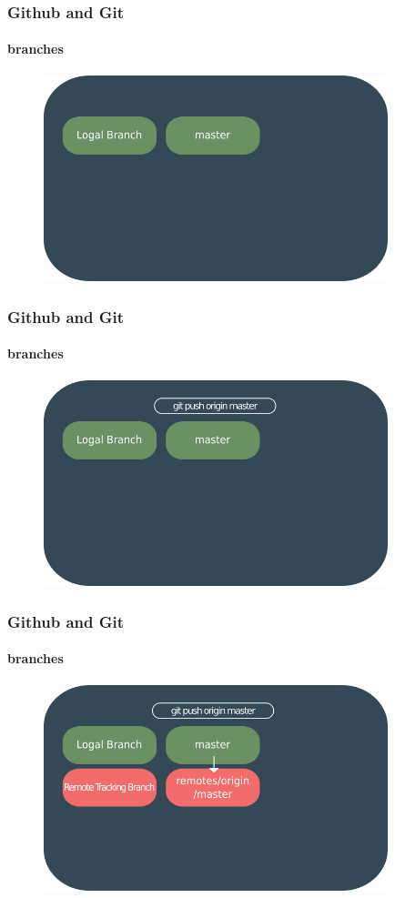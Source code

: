 \documentclass{beamer}
\begin{document}
	\begin{frame}
		\frametitle{Github and Git}
		\framesubtitle{branches}
		\begin{figure}[htbp]
			\centering
			\includegraphics[width=10cm]{remotebranch1}
		\end{figure}
	\end{frame}
	
	\begin{frame}
		\frametitle{Github and Git}
		\framesubtitle{branches}
		\begin{figure}[htbp]
			\centering
			\includegraphics[width=10cm]{remotebranch2}
		\end{figure}
	\end{frame}
	
	\begin{frame}
		\frametitle{Github and Git}
		\framesubtitle{branches}
		\begin{figure}[htbp]
			\centering
			\includegraphics[width=10cm]{remotebranch3}
		\end{figure}
	\end{frame}
	
\end{document}
